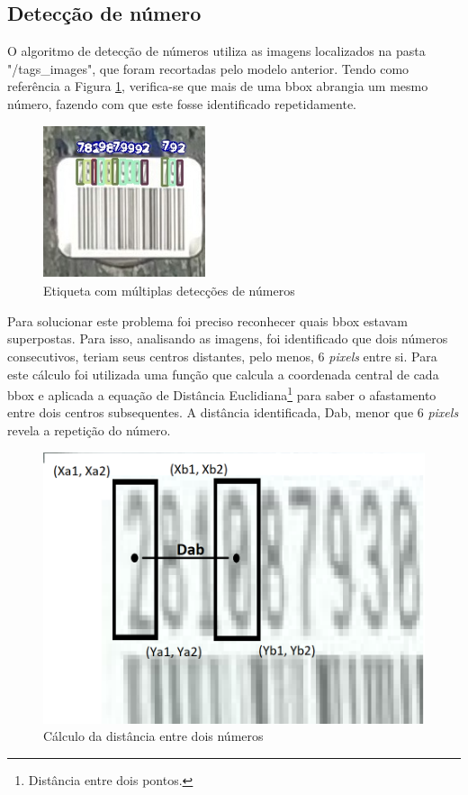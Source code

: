 \subsection{Detecção de número}


O algoritmo de detecção de números utiliza as imagens localizados na pasta "/tags\_images", que foram recortadas pelo modelo anterior.
%
Tendo como referência a Figura \ref{fig:numDup}, verifica-se que mais de uma bbox abrangia um mesmo número, fazendo com que este fosse identificado repetidamente. 

\begin{figure}[H]
	\centering
	\includegraphics[width=0.4\linewidth]{figuras/MachineLearning/numDup.png}
	\caption{Etiqueta com múltiplas detecções de números}
	\label{fig:numDup}
\end{figure}

Para solucionar este problema foi preciso reconhecer quais bbox estavam superpostas. Para isso, analisando as imagens, foi identificado que dois números consecutivos, teriam seus centros distantes, pelo menos, 6 \textit{pixels} entre si. 
%
Para este cálculo foi utilizada  uma função que calcula a coordenada central de cada bbox e aplicada a equação de Distância Euclidiana\footnote{Distância entre dois pontos.} para saber o afastamento entre dois centros subsequentes.
%
A distância identificada, Dab, menor que 6 \textit{pixels} revela a repetição do número.

\begin{figure}[H]
	\centering
	\includegraphics[width=0.6\linewidth]{figuras/MachineLearning/dab.png}
	\caption{Cálculo da distância entre dois números}
	\label{fig:dab}
\end{figure}

